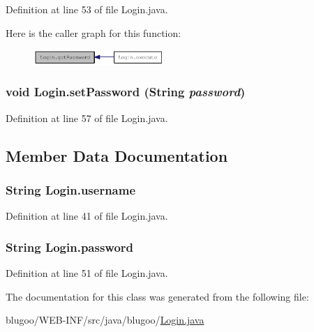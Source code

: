 Definition at line 53 of file Login.java.

Here is the caller graph for this function:\nopagebreak
\begin{figure}[H]
\begin{center}
\leavevmode
\includegraphics[width=140pt]{classLogin_a14a0020dc57ae10a4128bf964958f16_icgraph}
\end{center}
\end{figure}
\hypertarget{classLogin_314ab415c9a6709bc6f41291e72bb2c5}{
\subsubsection{\setlength{\rightskip}{0pt plus 5cm}void Login.setPassword (String {\em password})}}
\label{classLogin_314ab415c9a6709bc6f41291e72bb2c5}




Definition at line 57 of file Login.java.

\subsection{Member Data Documentation}
\hypertarget{classLogin_d2b4d8a7c18f724cef7e3494e15a3f0a}{
\subsubsection{\setlength{\rightskip}{0pt plus 5cm}String {\bf Login.username}}}
\label{classLogin_d2b4d8a7c18f724cef7e3494e15a3f0a}




Definition at line 41 of file Login.java.\hypertarget{classLogin_073065569cb434a1d28d841123d4d137}{
\subsubsection{\setlength{\rightskip}{0pt plus 5cm}String {\bf Login.password}}}
\label{classLogin_073065569cb434a1d28d841123d4d137}




Definition at line 51 of file Login.java.

The documentation for this class was generated from the following file:\begin{CompactItemize}
\item 
blugoo/WEB-INF/src/java/blugoo/\hyperlink{Login_8java}{Login.java}\end{CompactItemize}
